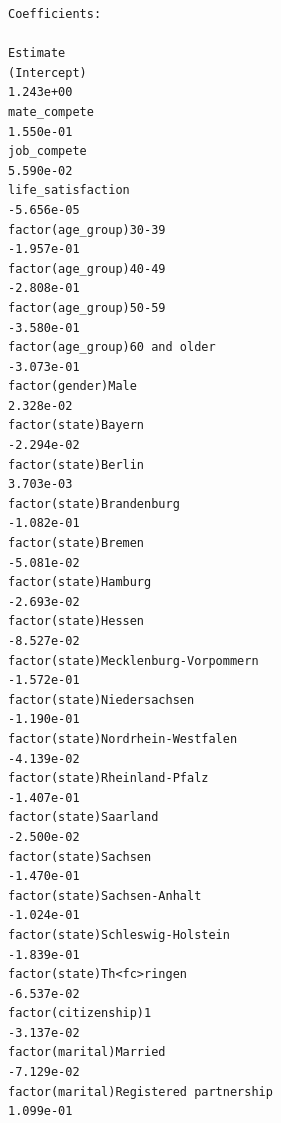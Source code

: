 \documentclass[
]{article}
\begin{document}
\begin{table}
\begin{minipage}[t]{\linewidth}
{\begin{verbatim}
Coefficients:
                                                                                    Estimate
(Intercept)                                                                        1.243e+00
mate_compete                                                                       1.550e-01
job_compete                                                                        5.590e-02
life_satisfaction                                                                 -5.656e-05
factor(age_group)30-39                                                            -1.957e-01
factor(age_group)40-49                                                            -2.808e-01
factor(age_group)50-59                                                            -3.580e-01
factor(age_group)60 and older                                                     -3.073e-01
factor(gender)Male                                                                 2.328e-02
factor(state)Bayern                                                               -2.294e-02
factor(state)Berlin                                                                3.703e-03
factor(state)Brandenburg                                                          -1.082e-01
factor(state)Bremen                                                               -5.081e-02
factor(state)Hamburg                                                              -2.693e-02
factor(state)Hessen                                                               -8.527e-02
factor(state)Mecklenburg-Vorpommern                                               -1.572e-01
factor(state)Niedersachsen                                                        -1.190e-01
factor(state)Nordrhein-Westfalen                                                  -4.139e-02
factor(state)Rheinland-Pfalz                                                      -1.407e-01
factor(state)Saarland                                                             -2.500e-02
factor(state)Sachsen                                                              -1.470e-01
factor(state)Sachsen-Anhalt                                                       -1.024e-01
factor(state)Schleswig-Holstein                                                   -1.839e-01
factor(state)Th<fc>ringen                                                         -6.537e-02
factor(citizenship)1                                                              -3.137e-02
factor(marital)Married                                                            -7.129e-02
factor(marital)Registered partnership                                              1.099e-01

\end{verbatim}}
\end{minipage}
\end{table}
\end{document}
